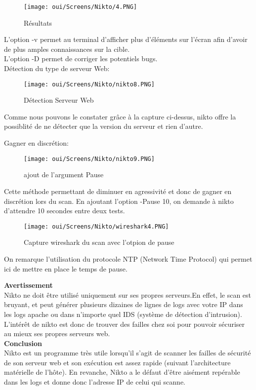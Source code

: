 \begin{figure}[htp!]
  \centering
  \setlength\figureheight{7cm}
  \setlength\figurewidth{9cm}
  \texttt{[image: oui/Screens/Nikto/4.PNG]}
  \caption{Résultats}
  \label{fig:courbe-tikz}
\end{figure}

L’option -v permet au terminal d’afficher plus d’éléments sur l’écran afin d’avoir de plus amples connaissances sur la cible.\\
L’option -D permet de corriger les potentiels bugs.\\

Détection du type de serveur Web:

\begin{figure}[htp!]
  \centering
  \setlength\figureheight{7cm}
  \setlength\figurewidth{9cm}
  \texttt{[image: oui/Screens/Nikto/nikto8.PNG]}
  \caption{Détection Serveur Web}
  \label{fig:courbe-tikz}
\end{figure}

Comme nous pouvons le constater grâce à la capture ci-dessus, nikto offre la possiblité de ne détecter que la version du serveur et rien d'autre. 

Gagner en discrétion:

\begin{figure}[htp!]
  \centering
  \setlength\figureheight{7cm}
  \setlength\figurewidth{9cm}
  \texttt{[image: oui/Screens/Nikto/nikto9.PNG]}
  \caption{ajout de l'argument Pause}
  \label{fig:courbe-tikz}
\end{figure}

Cette méthode permettant de diminuer en agressivité et donc de gagner en discrétion lors du scan. En ajoutant l'option -Pause 10, on demande à nikto d'attendre 10 secondes entre deux tests.

\begin{figure}[htp!]
  \centering
  \setlength\figureheight{7cm}
  \setlength\figurewidth{9cm}
  \texttt{[image: oui/Screens/Nikto/wireshark4.PNG]}
  \caption{Capture wireshark du scan avec l'otpion de pause}
  \label{fig:courbe-tikz}
\end{figure}

On remarque l'utilisation du protocole NTP (Network Time Protocol) qui permet ici de mettre en place le temps de pause.

\noindent \textbf{Avertissement}\\
Nikto ne doit être utilisé uniquement sur ses propres serveurs.En effet, le scan est bruyant, et peut générer plusieurs dizaines de lignes de logs avec votre IP dans les logs apache ou dans n’importe quel IDS (système de détection d’intrusion). L’intérêt de nikto est donc de trouver des failles chez soi pour pouvoir sécuriser au mieux ses propres serveurs web.\\
\noindent \textbf{Conclusion}\\
Nikto est un programme très utile lorsqu'il s'agit de scanner les failles de sécurité de son serveur web et son exécution est assez rapide (suivant l’architecture matérielle de l’hôte).
En revanche, Nikto a le défaut d’être aisément repérable dans les logs et donne donc l’adresse IP de celui qui scanne.
